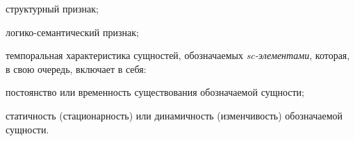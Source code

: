 \begin{textitemize}
	\item структурный признак;
	\item логико-семантический признак;
	\item темпоральная характеристика сущностей, обозначаемых \textit{sc-элементами}, которая, в свою очередь, включает в себя:
	\begin{textitemize}
		\item постоянство или временность существования обозначаемой сущности;
		\item статичность (стационарность) или динамичность (изменчивость) обозначаемой сущности.
	\end{textitemize}
\end{textitemize}


\begin{SCn}
	\scnstartstruct
	\begin{scnindent}
		\begin{scneqtoset}
			\begin{scnindent}
			\begin{scnsubdividing}
				\begin{scnindent}
				\begin{scnsubdividing}
					\begin{scnindent}
					\begin{scnsubdividing}
						\begin{scnindent}
							\begin{scnsubdividing}
								\begin{scnindent}
								\begin{scnsubdividing}
								\end{scnsubdividing}
								\end{scnindent}
							\end{scnsubdividing}

\end{scnindent}
\end{scnsubdividing}
\end{scnindent}
\end{scnsubdividing}
\end{scnindent}
\end{scnsubdividing}
\end{scnindent}
\end{scneqtoset}
\end{scnindent}
\end{SCn}
